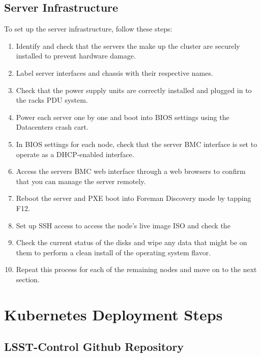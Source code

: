 \subsection{Server Infrastructure}
To set up the server infrastructure, follow these steps:
\begin{enumerate}
    \item Identify and check that the servers the make up the cluster are securely installed to prevent hardware damage.

    \item Label server interfaces and chassis with their respective names.

    \item Check that the power supply units are correctly installed and plugged in to the racks PDU system. 
    
    \item Power each server one by one and boot into BIOS settings using the Datacenters crash cart. 

    \item In BIOS settings for each node, check that the server BMC interface is set to operate as a DHCP-enabled interface. 

    \item Access the servers BMC web interface through a web browsers to confirm that you can manage the server remotely.

    \item Reboot the server and PXE boot into Foreman Discovery mode by tapping F12.

    \item Set up SSH access to access the node's live image ISO and check the 

    \item Check the current status of the disks and wipe any data that might be on them to perform a clean install of the operating system flavor.

    \item Repeat this process for each of the remaining nodes and move on to the next section.
\end{enumerate}

\vfill\eject

\section{ Kubernetes Deployment Steps}
\subsection{LSST-Control Github Repository}

